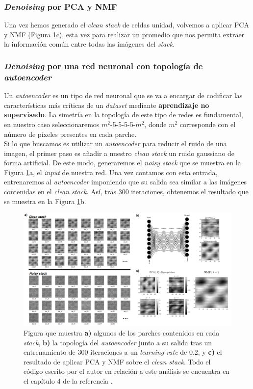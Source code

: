 \subsubsection{\textit{Denoising} por PCA y NMF}

Una vez hemos generado el \textit{clean stack} de celdas unidad, volvemos a aplicar PCA y NMF (Figura \ref{fig:17}c), esta vez para realizar un promedio que nos permita extraer la información común entre todas las imágenes del \textit{stack}.

\subsubsection{\textit{Denoising} por una red neuronal con topología de \textit{autoencoder}}

Un \textit{autoencoder} es un tipo de red neuronal que se va a encargar de codificar las características más críticas de un \textit{dataset} mediante \textbf{aprendizaje no supervisado}. La simetría en la topología de este tipo de redes es fundamental, en nuestro caso seleccionaremos $m^2$-5-5-5-5-$m^2$, donde $m^2$ corresponde con el número de píxeles presentes en cada parche.\\

Si lo que buscamos es utilizar un \textit{autoencoder} para reducir el ruido de una imagen, el primer paso es añadir a nuestro \textit{clean stack} un ruido gaussiano de forma artificial. De este modo, generaremos el \textit{noisy stack} que se muestra en la Figura \ref{fig:17}a, el \textit{input} de nuestra red. Una vez contamos con esta entrada, entrenaremos al \textit{autoencoder} imponiendo que su salida sea similar a las imágenes contenidas en el \textit{clean stack}. Así, tras 300 iteraciones, obtenemos el resultado que se muestra en la Figura \ref{fig:17}b.

\begin{figure}[h!]
    \centering
    \includegraphics[width=1\textwidth]{fig/Fig17.png}
    \caption{ Figura que muestra \textbf{a)} algunos de los parches contenidos en cada \textit{stack}, \textbf{b)} la topología del \textit{autoencoder} junto a su salida tras un entrenamiento de 300 iteraciones a un \textit{learning rate} de 0.2, y \textbf{c)} el resultado de aplicar PCA y NMF sobre el \textit{clean stack}. Todo el código escrito por el autor en relación a este análisis se encuentra en el capítulo 4 de la referencia \cite{repo}.}
    \label{fig:17}
\end{figure}

